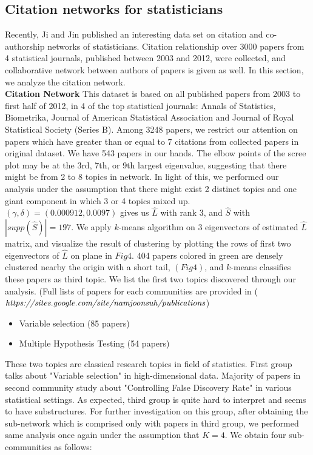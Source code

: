 \documentclass[AMS,STIX1COL]{WileyNJD-v2}
\begin{document}
\subsection{Citation networks for statisticians }
Recently, Ji and Jin \cite{ji2016coauthorship} published an interesting data set on citation  and co-authorship networks of statisticians.
Citation relationship over 3000 papers from 4 statistical journals, published between 2003 and 2012, were collected, and collaborative network between authors of papers is given as well.
In this section, we analyze the citation network. \\

\noindent\textbf{Citation Network} This dataset is based on all published papers from 2003 to first half of 2012, in 4 of the top statistical journals: Annals of Statistics, Biometrika, Journal of American Statistical Association and Journal of Royal Statistical Society (Series B).
Among  3248 papers, we restrict our attention on papers which have greater than or equal to 7 citations from collected papers in original dataset.
We have 543 papers in our hands.
The elbow points of the scree plot may be at the 3rd, 7th, or 9th largest eigenvalue, suggesting that there might be from 2 to 8 topics in network.
In light of this, we performed our analysis under the assumption that there might exist 2 distinct topics and one giant component in which 3 or 4 topics mixed up. \\

\noindent $(\gamma,\delta) = (0.000912,0.0097)$ gives us $\widehat{L}$ with rank 3, and $\widehat{S}$ with $|supp(\widehat{S})|=197$.
We apply $k$-means algorithm on 3 eigenvectors of estimated $\widehat{L}$ matrix, and visualize the result of clustering by plotting the rows of first two eigenvectors of $\widehat{L}$ on plane in $Fig 4$.
404 papers colored in green are densely clustered nearby the origin with a short tail, $(Fig 4)$, and $k$-means classifies these papers as third topic.
We list the first two topics discovered through our analysis.
(Full lists of papers for each communities are provided in ($\emph{https://sites.google.com/site/namjoonsuh/publications}$)

\begin{itemize}
  \item Variable selection (85 papers)
  \item Multiple Hypothesis Testing (54 papers)
\end{itemize}

\noindent These two topics are classical research topics in field of statistics.
First group talks about "Variable selection" in high-dimensional data.
Majority of papers in second community study about "Controlling False Discovery Rate" in various statistical settings.
As expected, third group is quite hard to interpret and seems to have substructures.
For further investigation on this group, after obtaining the sub-network which is comprised only with papers in third group, we performed same analysis once again under the assumption that $K=4$.
We obtain four sub-communities as follows:
\end{document}
